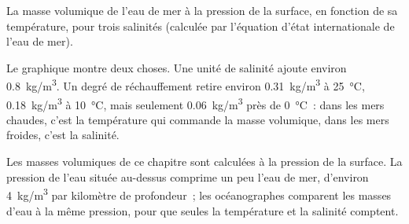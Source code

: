 \begin{omfigure}

{\small La masse volumique de l'eau de mer à la pression de la surface, en
fonction de sa température, pour trois salinités (calculée par l'équation
d'état internationale de l'eau de mer).}
\end{omfigure}

Le graphique montre deux choses. Une unité de salinité ajoute environ
\qty{0.8}{kg/m^3}. Un degré de réchauffement retire environ
\qty{0.31}{kg/m^3} à \qty{25}{\degreeCelsius}, \qty{0.18}{kg/m^3} à
\qty{10}{\degreeCelsius}, mais seulement \qty{0.06}{kg/m^3} près de
\qty{0}{\degreeCelsius}~: dans les mers chaudes, c'est la température qui
commande la masse volumique, dans les mers froides, c'est la salinité.

\begin{remark}
Les masses volumiques de ce chapitre sont calculées à la pression de la
surface. La pression de l'eau située au-dessus comprime un peu l'eau de
mer, d'environ \qty{4}{kg/m^3} par kilomètre de profondeur~; les
océanographes comparent les masses d'eau à la même pression, pour que seules
la température et la salinité comptent.
\end{remark}

